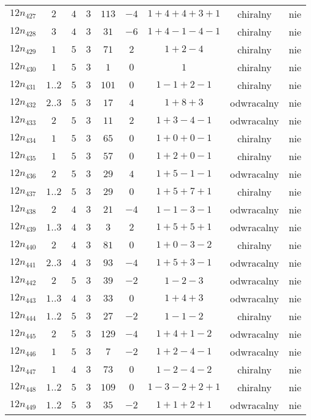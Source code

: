 \begin{longtable}{ccccccccc}
$12n_{427}$ & $2$ & $4$ & $3$ & $113$ & $-4$ & $1+4+4+3+1$ & chiralny & nie \\
$12n_{428}$ & $3$ & $4$ & $3$ & $31$ & $-6$ & $1+4-1-4-1$ & chiralny & nie \\
$12n_{429}$ & $1$ & $5$ & $3$ & $71$ & $2$ & $1+2-4$ & chiralny & nie \\
$12n_{430}$ & $1$ & $5$ & $3$ & $1$ & $0$ & $1$ & chiralny & nie \\
$12n_{431}$ & $1..2$ & $5$ & $3$ & $101$ & $0$ & $1-1+2-1$ & chiralny & nie \\
$12n_{432}$ & $2..3$ & $5$ & $3$ & $17$ & $4$ & $1+8+3$ & odwracalny & nie \\
$12n_{433}$ & $2$ & $5$ & $3$ & $11$ & $2$ & $1+3-4-1$ & odwracalny & nie \\
$12n_{434}$ & $1$ & $5$ & $3$ & $65$ & $0$ & $1+0+0-1$ & chiralny & nie \\
$12n_{435}$ & $1$ & $5$ & $3$ & $57$ & $0$ & $1+2+0-1$ & chiralny & nie \\
$12n_{436}$ & $2$ & $5$ & $3$ & $29$ & $4$ & $1+5-1-1$ & odwracalny & nie \\
$12n_{437}$ & $1..2$ & $5$ & $3$ & $29$ & $0$ & $1+5+7+1$ & chiralny & nie \\
$12n_{438}$ & $2$ & $4$ & $3$ & $21$ & $-4$ & $1-1-3-1$ & odwracalny & nie \\
$12n_{439}$ & $1..3$ & $4$ & $3$ & $3$ & $2$ & $1+5+5+1$ & odwracalny & nie \\
$12n_{440}$ & $2$ & $4$ & $3$ & $81$ & $0$ & $1+0-3-2$ & chiralny & nie \\
$12n_{441}$ & $2..3$ & $4$ & $3$ & $93$ & $-4$ & $1+5+3-1$ & odwracalny & nie \\
$12n_{442}$ & $2$ & $5$ & $3$ & $39$ & $-2$ & $1-2-3$ & odwracalny & nie \\
$12n_{443}$ & $1..3$ & $4$ & $3$ & $33$ & $0$ & $1+4+3$ & odwracalny & nie \\
$12n_{444}$ & $1..2$ & $5$ & $3$ & $27$ & $-2$ & $1-1-2$ & chiralny & nie \\
$12n_{445}$ & $2$ & $5$ & $3$ & $129$ & $-4$ & $1+4+1-2$ & odwracalny & nie \\
$12n_{446}$ & $1$ & $5$ & $3$ & $7$ & $-2$ & $1+2-4-1$ & odwracalny & nie \\
$12n_{447}$ & $1$ & $4$ & $3$ & $73$ & $0$ & $1-2-4-2$ & chiralny & nie \\
$12n_{448}$ & $1..2$ & $5$ & $3$ & $109$ & $0$ & $1-3-2+2+1$ & chiralny & nie \\
$12n_{449}$ & $1..2$ & $5$ & $3$ & $35$ & $-2$ & $1+1+2+1$ & odwracalny & nie \\

\end{longtable}
